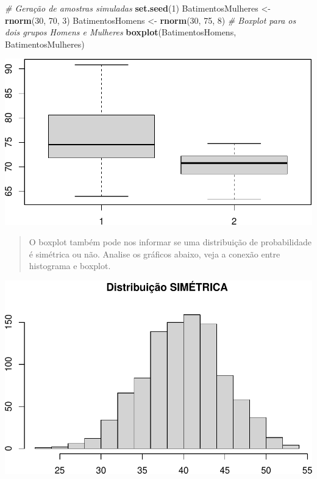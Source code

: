 \documentclass[
]{book}
\newenvironment{Shaded}{\begin{snugshade}}{\end{snugshade}}
\newcommand{\CommentTok}[1]{\textcolor[rgb]{0.56,0.35,0.01}{\textit{#1}}}
\newcommand{\DecValTok}[1]{\textcolor[rgb]{0.00,0.00,0.81}{#1}}
\newcommand{\FunctionTok}[1]{\textcolor[rgb]{0.13,0.29,0.53}{\textbf{#1}}}
\newcommand{\NormalTok}[1]{#1}
\newcommand{\OtherTok}[1]{\textcolor[rgb]{0.56,0.35,0.01}{#1}}
\begin{document}
\begin{Shaded}
\begin{Highlighting}[]
\CommentTok{\# Geração de amostras simuladas}
\FunctionTok{set.seed}\NormalTok{(}\DecValTok{1}\NormalTok{)}
\NormalTok{BatimentosMulheres }\OtherTok{\textless{}{-}} \FunctionTok{rnorm}\NormalTok{(}\DecValTok{30}\NormalTok{, }\DecValTok{70}\NormalTok{, }\DecValTok{3}\NormalTok{)}
\NormalTok{BatimentosHomens }\OtherTok{\textless{}{-}} \FunctionTok{rnorm}\NormalTok{(}\DecValTok{30}\NormalTok{, }\DecValTok{75}\NormalTok{, }\DecValTok{8}\NormalTok{)}
\CommentTok{\# Boxplot para os dois grupos Homens e Mulheres }
\FunctionTok{boxplot}\NormalTok{(BatimentosHomens, BatimentosMulheres)}
\end{Highlighting}
\end{Shaded}

\includegraphics{LivroEstatisticaR_files/figure-latex/unnamed-chunk-20-1.pdf}

\begin{quote}
O boxplot também pode nos informar se uma distribuição de probabilidade é simétrica ou não. Analise os gráficos abaixo, veja a conexão entre histograma e boxplot.
\end{quote}

\includegraphics{LivroEstatisticaR_files/figure-latex/unnamed-chunk-21-1.pdf}
\end{document}
